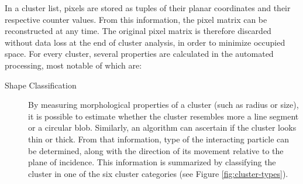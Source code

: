 In a cluster list, pixels are stored as tuples of their planar coordinates and their respective counter values. From this information, the pixel matrix can be reconstructed at any time. The original pixel matrix is therefore discarded without data loss at the end of cluster analysis, in order to minimize occupied space. For every cluster, several properties are calculated in the automated processing, most notable of which are:

\label{db:cluster-properties}
\begin{description}
	\item[Shape Classification]
	\label{db:shape-classification}
	By measuring morphological properties of a cluster (such as radius or size), it is possible to estimate whether the cluster resembles more a line segment or a circular blob. Similarly, an algorithm can ascertain if the cluster looks thin or thick. From that information, type of the interacting particle can be determined, along with the direction of its movement relative to the plane of incidence. This information is summarized by classifying the cluster in one of the six cluster categories (see Figure \ref{fig:cluster-types}).

    \begin{figure}[t]
    \begin{center}

\end{center}
\end{figure}
\end{description}
